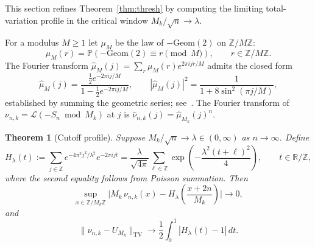 \documentclass[11pt,a4paper]{amsart}
\theoremstyle{plain}
\newtheorem{theorem}{Theorem}[section]
\theoremstyle{definition}
\newcommand{\Z}{\mathbb{Z}}
\newcommand{\R}{\mathbb{R}}
\newcommand{\PP}{\mathbb{P}}
\newcommand{\TV}{\mathrm{TV}}
\newcommand{\Geom}{\mathrm{Geom}}
\begin{document}
This section refines Theorem~\ref{thm:thresh} by computing the limiting
total-variation profile in the critical window $M_k/\sqrt n\to\lambda$.

For a modulus $M\ge1$ let $\mu_M$ be the law of $-\Geom(2)$ on $\Z/M\Z$:
\begin{equation}\label{eq:muM}
\mu_M(r)=\PP(-\Geom(2)\equiv r\pmod M),\qquad r\in\Z/M\Z.
\end{equation}
The Fourier transform $\widehat\mu_M(j)=\sum_r\mu_M(r)e^{2\pi ijr/M}$ admits
the closed form
\begin{equation}\label{eq:muMhat}
\widehat\mu_M(j)=\frac{\tfrac12 e^{-2\pi ij/M}}
{1-\tfrac12 e^{-2\pi ij/M}},
\qquad
|\widehat\mu_M(j)|^2=\frac1{1+8\sin^2(\pi j/M)},
\end{equation}
established by summing the geometric series; see~\cite[\S3]{SiNote}.
The Fourier transform of $\nu_{n,k}=\mathcal L(-S_n\bmod M_k)$ at $j$ is
$\widehat\nu_{n,k}(j)=\widehat\mu_{M_k}(j)^n$.

\begin{theorem}[Cutoff profile]\label{thm:profile}
Suppose $M_k/\sqrt n\to\lambda\in(0,\infty)$ as $n\to\infty$.
Define
\begin{equation}\label{eq:Hlambda}
H_\lambda(t):=\sum_{j\in\Z}e^{-4\pi^2 j^2/\lambda^2}e^{-2\pi ijt}
=\frac{\lambda}{\sqrt{4\pi}}\sum_{\ell\in\Z}
\exp\!\left(-\frac{\lambda^2(t+\ell)^2}{4}\right),
\qquad t\in\R/\Z,
\end{equation}
where the second equality follows from Poisson summation.
Then
\begin{equation}\label{eq:profile}
\sup_{x\in\Z/M_k\Z}\biggl|M_k\,\nu_{n,k}(x)-H_\lambda\!\left(\frac{x+2n}{M_k}\right)\biggr|\to0,
\end{equation}
and
\begin{equation}\label{eq:TVprofile}
\|\nu_{n,k}-U_{M_k}\|_{\TV}\to\frac12\int_0^1|H_\lambda(t)-1|\,dt.
\end{equation}
\end{theorem}
\end{document}
